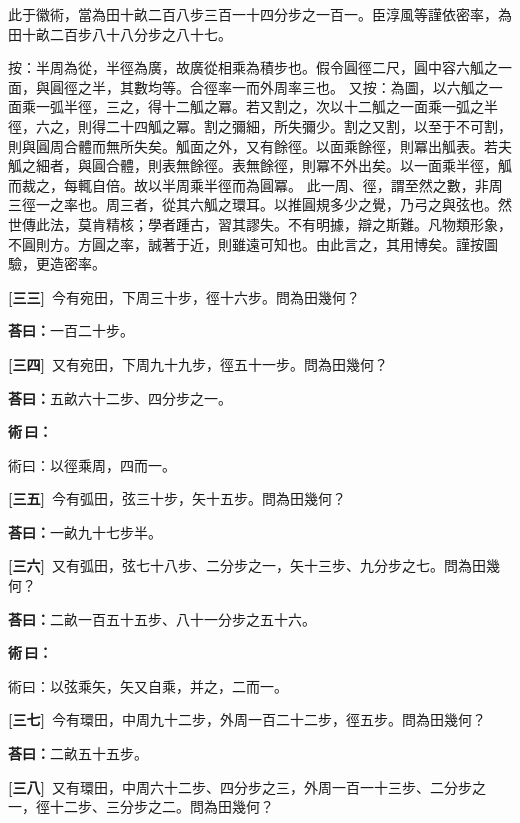 \documentclass[11pt,a4paper]{article}
\newenvironment{method}{%
  \par\noindent\textcolor{methodcolor}{\textbf{術\,曰：}}%
  \ignorespaces
}{\par\vspace{0.5em}}
\newcommand{\liuhui}[1]{\textcolor{commentarycolor}{\small #1}}
\newcommand{\problemnum}[1]{\textbf{[\ignorespaces#1\unskip]}}
\begin{document}
\noindent\liuhui{%
此于徽術，當為田十畝二百八步三百一十四分步之一百一。臣淳風等謹依密率，為田十畝二百步八十八分步之八十七。

按：半周為從，半徑為廣，故廣從相乘為積步也。假令圓徑二尺，圓中容六觚之一面，與圓徑之半，其數均等。合徑率一而外周率三也。
又按：為圖，以六觚之一面乘一弧半徑，三之，得十二觚之冪。若又割之，次以十二觚之一面乘一弧之半徑，六之，則得二十四觚之冪。割之彌細，所失彌少。割之又割，以至于不可割，則與圓周合體而無所失矣。觚面之外，又有餘徑。以面乘餘徑，則冪出觚表。若夫觚之細者，與圓合體，則表無餘徑。表無餘徑，則冪不外出矣。以一面乘半徑，觚而裁之，每輒自倍。故以半周乘半徑而為圓冪。
此一周、徑，謂至然之數，非周三徑一之率也。周三者，從其六觚之環耳。以推圓規多少之覺，乃弓之與弦也。然世傳此法，莫肯精核；學者踵古，習其謬失。不有明據，辯之斯難。凡物類形象，不圓則方。方圓之率，誠著于近，則雖遠可知也。由此言之，其用博矣。謹按圖驗，更造密率。}

\noindent\problemnum{三三}\,
今有宛田，下周三十步，徑十六步。問為田幾何？

\noindent\textcolor{answercolor}{\textbf{荅曰：}}一百二十步。

\noindent\problemnum{三四}\,
又有宛田，下周九十九步，徑五十一步。問為田幾何？

\noindent\textcolor{answercolor}{\textbf{荅曰：}}五畝六十二步、四分步之一。

\begin{method}
術曰：以徑乘周，四而一。
\end{method}

\noindent\problemnum{三五}\,
今有弧田，弦三十步，矢十五步。問為田幾何？

\noindent\textcolor{answercolor}{\textbf{荅曰：}}一畝九十七步半。

\noindent\problemnum{三六}\,
又有弧田，弦七十八步、二分步之一，矢十三步、九分步之七。問為田幾何？

\noindent\textcolor{answercolor}{\textbf{荅曰：}}二畝一百五十五步、八十一分步之五十六。

\begin{method}
術曰：以弦乘矢，矢又自乘，并之，二而一。
\end{method}

\noindent\problemnum{三七}\,
今有環田，中周九十二步，外周一百二十二步，徑五步。問為田幾何？

\noindent\textcolor{answercolor}{\textbf{荅曰：}}二畝五十五步。

\noindent\problemnum{三八}\,
又有環田，中周六十二步、四分步之三，外周一百一十三步、二分步之一，徑十二步、三分步之二。問為田幾何？
\end{document}
